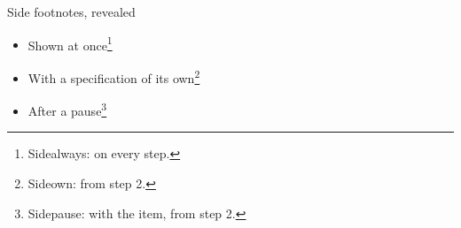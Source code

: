 \sidefootnotes
\begin{standardframe}{Side footnotes, revealed}
	\begin{itemize}
		\item Shown at once\footnote{Sidealways: on every step.}
		\item With a specification of its own\footnote<2->{Sideown: from step 2.}
		\pause
		\item After a pause\footnote{Sidepause: with the item, from step 2.}
	\end{itemize}
\end{standardframe}
